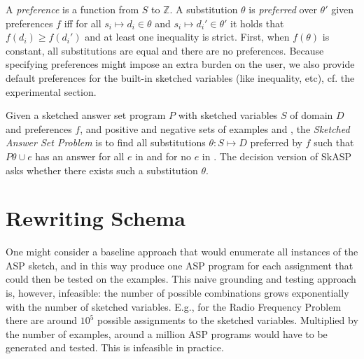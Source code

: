A \textit{preference} is a function from $S$ to $\mathbb{Z}$. A substitution $\theta$ is \textit{preferred} over $\theta'$ given preferences $f$ iff for all $s_i \mapsto d_i \in \theta$ and $s_{i} \mapsto d_{i}' \in \theta'$ it holds that $f(d_i) \geq f(d_{i}')$ and at least one inequality is strict. First, when $f(\theta)$ is constant,
all substitutions are equal and there are no preferences. Because specifying preferences might impose an extra burden on the user, we also provide default preferences for the built-in sketched variables (like inequality, etc), cf. the experimental section.



\begin{definition}
  Given  a sketched answer set program $P$ with sketched variables $S$ of domain $D$ and preferences $f$, and positive and negative sets of examples \eplus and \eminus, the \emph{Sketched Answer Set Problem} is to find all substitutions $\theta:S\mapsto D$ preferred by $f$ such that $P\theta \cup e$ has an answer for all $e$ in \eplus and for no $e$ in \eminus. 
%
The decision version 
of SkASP  asks whether there exists such a substitution $\theta$.
\end{definition}


\section{Rewriting Schema}\label{sec:method}
One might consider a baseline approach that would enumerate all instances of the ASP sketch, and in this way produce
one ASP program for each assignment that could then be tested on the examples. 
This naive grounding and testing approach is, however, infeasible: the number of possible combinations grows exponentially with the number of sketched variables. E.g., for the Radio Frequency Problem there are around $10^5$ possible assignments to the sketched variables. Multiplied by the number of examples, around a million ASP programs would have to be generated and tested. This is  infeasible in practice.   



